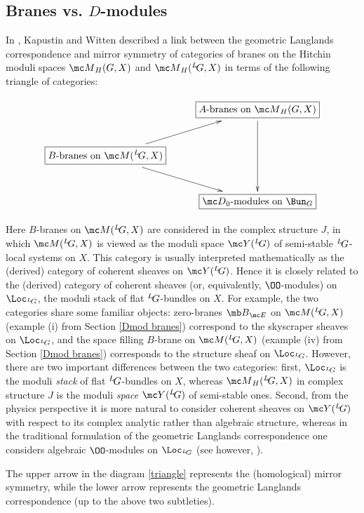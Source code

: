 \documentclass[11pt,reqno]{amsart}
\theoremstyle{plain}
\numberwithin{equation}{section}
\def\neg{\negthinspace}
\def\LG{{}^L\neg G}
\theoremstyle{definition}
\begin{document}
\subsection{Branes vs. $D$-modules}    \label{branes vs D}

In \cite{KW}, Kapustin and Witten described a link between the
geometric Langlands correspondence and mirror symmetry of categories
of branes on the Hitchin moduli spaces ${\mc M}_H(G,X)$ and ${\mc
  M}_H(\LG,X)$ in terms of the following triangle of categories:

\smallskip

\begin{equation}    \label{triangle}
\xymatrix{& \boxed{\text{$A$-branes on } {\mc M}_H(G,X)} \ar[dd] \\
\boxed{\text{$B$-branes on } {\mc M}(\LG,X)} \ar[ur] \ar[dr] \\
& \boxed{{\mc D}_0\text{-modules on } \Bun_G}
}
\end{equation}

\medskip

Here $B$-branes on ${\mc M}(\LG,X)$ are considered in the complex
structure $J$, in which ${\mc M}(\LG,X)$ is viewed as the moduli space
${\mc Y}(\LG)$ of semi-stable $\LG$-local systems on $X$. This
category is usually interpreted mathematically as the (derived)
category of coherent sheaves on ${\mc Y}(\LG)$. Hence it is closely
related to the (derived) category of coherent sheaves (or,
equivalently, $\OO$-modules) on $\Loc_{\LG}$, the moduli stack of flat
$\LG$-bundles on $X$. For example, the two categories share some
familiar objects: zero-branes ${\mb B}_{\mc E}$ on ${\mc M}(\LG,X)$
(example (i) from Section \ref{Dmod branes}) correspond to the
skyscraper sheaves on $\Loc_{\LG}$, and the space filling $B$-brane on
${\mc M}(\LG,X)$ (example (iv) from Section \ref{Dmod branes})
corresponds to the structure sheaf on $\Loc_{\LG}$. However, there are
two important differences between the two categories: first,
$\Loc_{\LG}$ is the moduli {\em stack} of flat $\LG$-bundles on $X$,
whereas ${\mc M}_H(\LG,X)$ in complex structure $J$ is the moduli {\em
  space} ${\mc Y}(\LG)$ of semi-stable ones. Second, from the physics
perspective it is more natural to consider coherent sheaves on ${\mc
  Y}(\LG)$ with respect to its complex analytic rather than algebraic
structure, whereas in the traditional formulation of the geometric
Langlands correspondence one considers algebraic $\OO$-modules on
$\Loc_{\LG}$ (see however, \cite{EY}).

The upper arrow in the diagram \eqref{triangle} represents the
(homological) mirror symmetry, while the lower arrow represents the
geometric Langlands correspondence (up to the above two subtleties).
\end{document}

